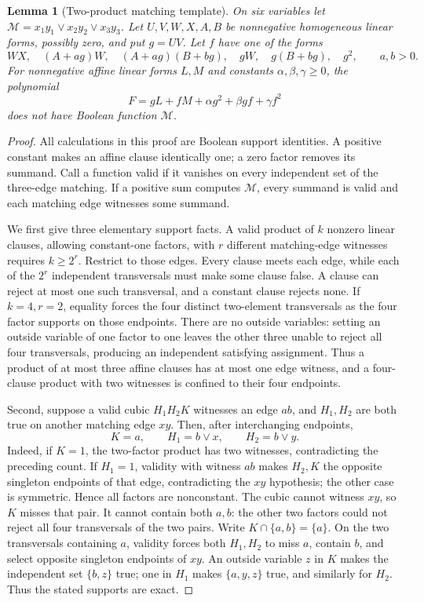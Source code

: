 \documentclass[11pt]{article}
\newtheorem{lemma}[theorem]{Lemma}
\theoremstyle{definition}
\theoremstyle{remark}
\begin{document}
\begin{lemma}[Two-product matching template]\label{lem:twoproductmatching}
On six variables let $\mathcal M=x_1y_1\vee x_2y_2\vee x_3y_3$. Let $U,V,W,X,A,B$ be nonnegative homogeneous linear forms, possibly zero, and put $g=UV$. Let $f$ have one of the forms
\[
 WX,\quad (A+ag)W,\quad (A+ag)(B+bg),\quad
 gW,\quad g(B+bg),\quad g^2,
 \qquad a,b>0.
\]
For nonnegative affine linear forms $L,M$ and constants $\alpha,\beta,\gamma\ge0$, the polynomial
\[
 F=gL+fM+\alpha g^2+\beta gf+\gamma f^2
\]
does not have Boolean function $\mathcal M$.
\end{lemma}
\begin{proof}
All calculations in this proof are Boolean support identities. A positive constant makes an affine clause identically one; a zero factor removes its summand. Call a function valid if it vanishes on every independent set of the three-edge matching. If a positive sum computes $\mathcal M$, every summand is valid and each matching edge witnesses some summand.

We first give three elementary support facts. A valid product of $k$ nonzero linear clauses, allowing constant-one factors, with $r$ different matching-edge witnesses requires $k\ge2^r$. Restrict to those edges. Every clause meets each edge, while each of the $2^r$ independent transversals must make some clause false. A clause can reject at most one such transversal, and a constant clause rejects none. If $k=4,r=2$, equality forces the four distinct two-element transversals as the four factor supports on those endpoints. There are no outside variables: setting an outside variable of one factor to one leaves the other three unable to reject all four transversals, producing an independent satisfying assignment. Thus a product of at most three affine clauses has at most one edge witness, and a four-clause product with two witnesses is confined to their four endpoints.

Second, suppose a valid cubic $H_1H_2K$ witnesses an edge $ab$, and $H_1,H_2$ are both true on another matching edge $xy$. Then, after interchanging endpoints,
\[
 K=a,\qquad H_1=b\vee x,\qquad H_2=b\vee y.
\]
Indeed, if $K=1$, the two-factor product has two witnesses, contradicting the preceding count. If $H_1=1$, validity with witness $ab$ makes $H_2,K$ the opposite singleton endpoints of that edge, contradicting the $xy$ hypothesis; the other case is symmetric. Hence all factors are nonconstant. The cubic cannot witness $xy$, so $K$ misses that pair. It cannot contain both $a,b$: the other two factors could not reject all four transversals of the two pairs. Write $K\cap\{a,b\}=\{a\}$. On the two transversals containing $a$, validity forces both $H_1,H_2$ to miss $a$, contain $b$, and select opposite singleton endpoints of $xy$. An outside variable $z$ in $K$ makes the independent set $\{b,z\}$ true; one in $H_1$ makes $\{a,y,z\}$ true, and similarly for $H_2$. Thus the stated supports are exact.


\end{proof}
\end{document}
